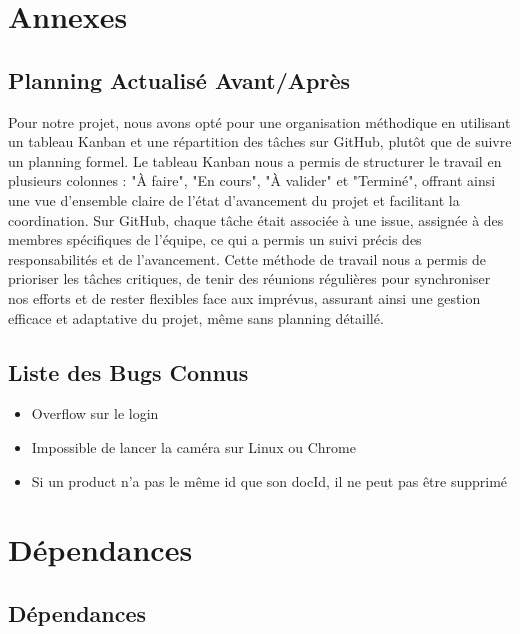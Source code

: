 \section{Annexes}

\subsection{Planning Actualisé Avant/Après}

Pour notre projet, nous avons opté pour une organisation méthodique en utilisant un tableau Kanban et une répartition des tâches sur GitHub, plutôt que de suivre un planning formel. Le tableau Kanban nous a permis de structurer le travail en plusieurs colonnes : "À faire", "En cours", "À valider" et "Terminé", offrant ainsi une vue d'ensemble claire de l'état d'avancement du projet et facilitant la coordination. Sur GitHub, chaque tâche était associée à une issue, assignée à des membres spécifiques de l'équipe, ce qui a permis un suivi précis des responsabilités et de l'avancement. Cette méthode de travail nous a permis de prioriser les tâches critiques, de tenir des réunions régulières pour synchroniser nos efforts et de rester flexibles face aux imprévus, assurant ainsi une gestion efficace et adaptative du projet, même sans planning détaillé.

\subsection{Liste des Bugs Connus}

\begin{itemize}[noitemsep]
    \item Overflow sur le login
    \item Impossible de lancer la caméra sur Linux ou Chrome
    \item Si un product n'a pas le même id que son docId, il ne peut pas être supprimé
\end{itemize}

\section*{Dépendances}

\subsection{Dépendances}

